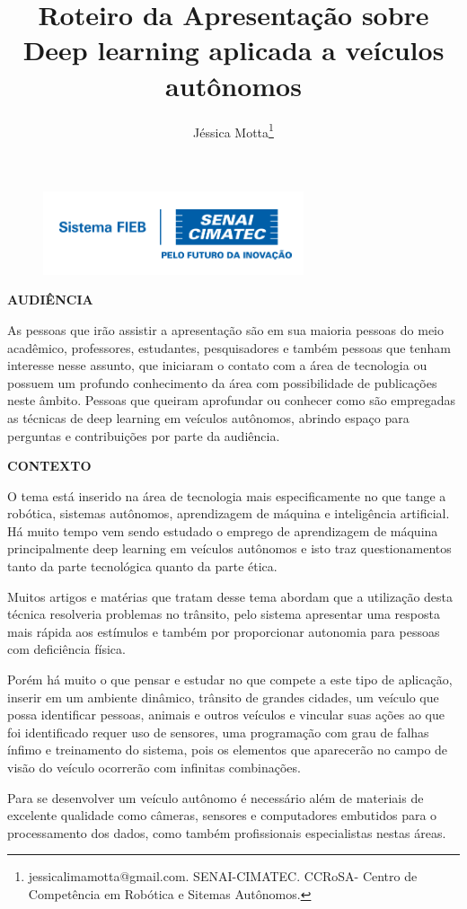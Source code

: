 \documentclass[12pt,a4paper]{article}
\begin{document}
 
\begin{figure}
    \flushright
    \includegraphics[scale=0.5]{Logo_senai.png}
\end{figure}

\title{Roteiro da Apresentação sobre Deep learning aplicada a veículos autônomos}
\author{Jéssica Motta\thanks{jessicalimamotta@gmail.com. SENAI-CIMATEC. CCRoSA- Centro de Competência em Robótica e Sitemas Autônomos.}}
 
 

    \maketitle
    \singlespacing


    \textbf{AUDIÊNCIA}

    \par As pessoas que irão assistir a apresentação são em sua maioria pessoas do meio acadêmico, professores, estudantes, pesquisadores e também pessoas que tenham interesse nesse assunto, que iniciaram o contato com a área de tecnologia ou possuem um profundo conhecimento da área com possibilidade de publicações neste âmbito. Pessoas que queiram aprofundar ou conhecer como são empregadas as técnicas de deep learning em veículos autônomos, abrindo espaço para perguntas e contribuições por parte da audiência.

    \pagebreak

    \textbf{CONTEXTO}
    \par O tema está inserido na área de tecnologia mais especificamente no que tange a robótica, sistemas autônomos, aprendizagem de máquina e inteligência artificial. Há muito tempo vem sendo estudado o emprego de aprendizagem de máquina principalmente deep learning em veículos autônomos e isto traz questionamentos tanto da parte tecnológica quanto da parte ética.
    \par Muitos artigos e matérias que tratam desse tema abordam que a utilização desta técnica resolveria problemas no trânsito, pelo sistema apresentar uma resposta mais rápida aos estímulos e também por proporcionar autonomia para pessoas com deficiência física.
    \par Porém há muito o que pensar e estudar no que compete a este tipo de aplicação, inserir em um ambiente dinâmico, trânsito de grandes cidades, um veículo que possa identificar pessoas, animais e outros veículos e vincular suas ações ao que foi identificado requer uso de sensores, uma programação com grau de falhas ínfimo e treinamento do sistema, pois os elementos que aparecerão no campo de visão do veículo ocorrerão com infinitas combinações.
    \par Para se desenvolver um veículo autônomo é necessário além de materiais de excelente qualidade como câmeras, sensores e computadores embutidos para o processamento dos dados, como também profissionais especialistas nestas áreas.
\end{document}
